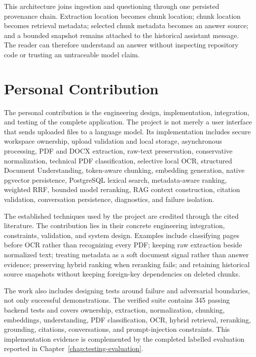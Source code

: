 This architecture joins ingestion and questioning through one persisted provenance chain. Extraction location becomes chunk location; chunk location becomes retrieval metadata; selected chunk metadata becomes an answer source; and a bounded snapshot remains attached to the historical assistant message. The reader can therefore understand an answer without inspecting repository code or trusting an untraceable model claim.

\section{Personal Contribution}
\label{sec:introduction-contribution}

The personal contribution is the engineering design, implementation, integration, and testing of the complete application. The project is not merely a user interface that sends uploaded files to a language model. Its implementation includes secure workspace ownership, upload validation and local storage, asynchronous processing, PDF and DOCX extraction, raw-text preservation, conservative normalization, technical PDF classification, selective local OCR, structured Document Understanding, token-aware chunking, embedding generation, native pgvector persistence, PostgreSQL lexical search, metadata-aware ranking, weighted RRF, bounded model reranking, RAG context construction, citation validation, conversation persistence, diagnostics, and failure isolation.

The established techniques used by the project are credited through the cited literature. The contribution lies in their concrete engineering integration, constraints, validation, and system design. Examples include classifying pages before OCR rather than recognizing every PDF; keeping raw extraction beside normalized text; treating metadata as a soft document signal rather than answer evidence; preserving hybrid ranking when reranking fails; and retaining historical source snapshots without keeping foreign-key dependencies on deleted chunks.

The work also includes designing tests around failure and adversarial boundaries, not only successful demonstrations. The verified suite contains 345 passing backend tests and covers ownership, extraction, normalization, chunking, embeddings, understanding, PDF classification, OCR, hybrid retrieval, reranking, grounding, citations, conversations, and prompt-injection constraints. This implementation evidence is complemented by the completed labelled evaluation reported in Chapter~\ref{chap:testing-evaluation}.

